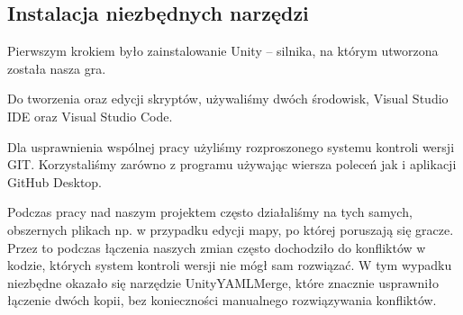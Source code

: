 \subsection{Instalacja niezbędnych narzędzi}
Pierwszym krokiem było zainstalowanie Unity – silnika, na którym utworzona została nasza gra. 

Do tworzenia oraz edycji skryptów, używaliśmy dwóch środowisk, Visual Studio IDE oraz Visual Studio Code. 

Dla usprawnienia wspólnej pracy użyliśmy rozproszonego systemu kontroli wersji GIT. Korzystaliśmy zarówno z programu używając wiersza poleceń jak i aplikacji GitHub Desktop.

Podczas pracy nad naszym projektem często działaliśmy na tych samych, obszernych plikach np. w przypadku edycji mapy, po której poruszają się gracze. 
Przez to podczas łączenia naszych zmian często dochodziło do konfliktów w kodzie, których system kontroli wersji nie mógł sam rozwiązać. 
W tym wypadku niezbędne okazało się narzędzie UnityYAMLMerge, które znacznie usprawniło łączenie dwóch kopii, bez konieczności manualnego rozwiązywania konfliktów.